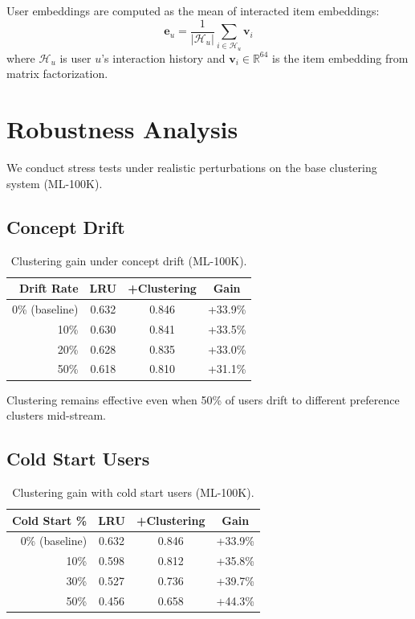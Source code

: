 \documentclass{article}
\begin{document}
User embeddings are computed as the mean of interacted item embeddings:
\begin{equation}
\mathbf{e}_u = \frac{1}{|\mathcal{H}_u|} \sum_{i \in \mathcal{H}_u} \mathbf{v}_i
\end{equation}
where $\mathcal{H}_u$ is user $u$'s interaction history and $\mathbf{v}_i \in \mathbb{R}^{64}$ is the item embedding from matrix factorization.

\section{Robustness Analysis}
\label{app:stress}

We conduct stress tests under realistic perturbations on the base clustering system (ML-100K).

\subsection{Concept Drift}

\begin{table}[h]
\centering
\caption{Clustering gain under concept drift (ML-100K).}
\label{tab:drift}
\small
\begin{tabular}{rccc}
\toprule
\textbf{Drift Rate} & \textbf{LRU} & \textbf{+Clustering} & \textbf{Gain} \\
\midrule
0\% (baseline) & 0.632 & 0.846 & +33.9\% \\
10\% & 0.630 & 0.841 & +33.5\% \\
20\% & 0.628 & 0.835 & +33.0\% \\
50\% & 0.618 & 0.810 & +31.1\% \\
\bottomrule
\end{tabular}
\end{table}

Clustering remains effective even when 50\% of users drift to different preference clusters mid-stream.

\subsection{Cold Start Users}

\begin{table}[h]
\centering
\caption{Clustering gain with cold start users (ML-100K).}
\label{tab:cold}
\small
\begin{tabular}{rccc}
\toprule
\textbf{Cold Start \%} & \textbf{LRU} & \textbf{+Clustering} & \textbf{Gain} \\
\midrule
0\% (baseline) & 0.632 & 0.846 & +33.9\% \\
10\% & 0.598 & 0.812 & +35.8\% \\
30\% & 0.527 & 0.736 & +39.7\% \\
50\% & 0.456 & 0.658 & +44.3\% \\
\bottomrule
\end{tabular}
\end{table}
\end{document}
